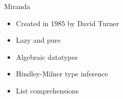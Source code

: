 \documentclass[pdf]{beamer}
\begin{document}
\begin{frame}{Miranda}
  \begin{figure}[H]
    \centering
    \hspace{0.3cm}
  \end{figure}
  \begin{itemize}
  \item Created in 1985 by David Turner
  \item Lazy and pure
  \item Algebraic datatypes
  \item Hindley-Milner type inference
  \item List comprehensions
  \end{itemize}
\end{frame}
\end{document}
